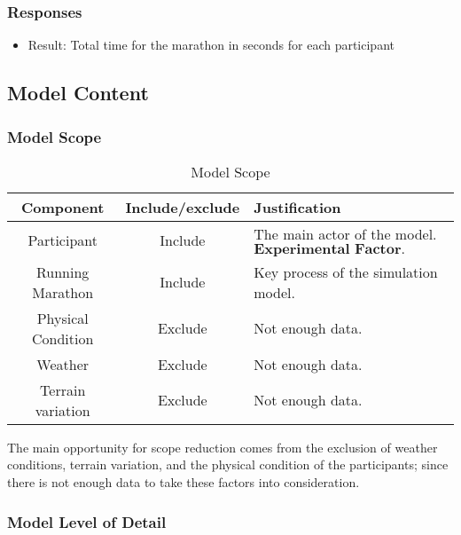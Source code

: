 \documentclass[11pt, oneside]{article}   	%
\begin{document}
\subsubsection{Responses}

\begin{itemize}
\item  Result: Total time for the marathon in seconds for each participant
\end{itemize}

\subsection{Model Content}

\subsubsection{Model Scope}

\begin{table}[H]
\caption{Model Scope}
 \begin{tabularx}{\columnwidth}{|c|c|X|}
 \hline
  Component & Include/exclude & Justification\\ 
  \hline \hline
  Participant & Include & The main actor of the model.  $\textbf{Experimental Factor.}$\\ 
  Running Marathon & Include & Key process of the simulation model.\\ 
  Physical Condition & Exclude & Not enough data.\\ 
  Weather & Exclude & Not enough data.\\ 
  Terrain variation & Exclude & Not enough data. \\
 \hline
\end{tabularx}
\label{table: model scope}
\end{table}

The main opportunity for scope reduction comes from the exclusion of weather conditions, terrain variation, and the physical condition of the participants; since there is not enough data to take these factors into consideration. \\


\subsubsection{Model Level of Detail}
\end{document}
